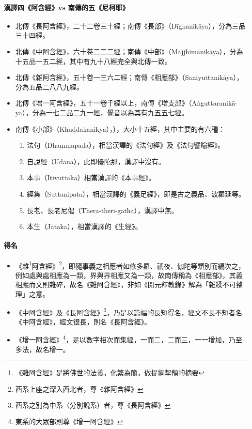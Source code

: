 \paragraph{漢譯四《阿含經》vs 南傳的五《尼柯耶》}
\begin{itemize}
  \item 北傳《長阿含經》，二十二卷三十經；南傳《長部》（Dīghanikāya），分為三品三十四經。
  \item 北傳《中阿含經》，六十卷二二二經；南傳《中部》（Majjhimanikāya），分為十五品一五二經，其中有九十八經完全與北傳一致。
  \item 北傳《雜阿含經》，五十卷一三六二經；南傳《相應部》（Saṁyuttanikāya），分為五品二八八九經。
  \item 北傳《增一阿含經》，五十一卷千經以上，南傳《增支部》（Aṅguttaranikā-ya），分為一七二品二九一經，覺音以為其有九五五七經。
  \item 南傳《小部》（Khuddakanikya），），大小十五經，其中主要的有六種：
    \begin{enumerate}
      \item 法句（Dhammapada），相當漢譯的《法句經》及《法句譬喻經》。
      \item 自說經（Udāna），此即優陀那，漢譯中沒有。
      \item 本事（Itivuttaka）相當漢譯的《本事經》。
      \item 經集（Suttanipata），相當漢譯的《義足經》，即是古之義品、波羅延等。
      \item 長老、長老尼偈（Thera-theri-gatha），漢譯中無。
      \item 本生（Jātaka），相當漢譯的《生經》。
    \end{enumerate}
\end{itemize}
\paragraph{得名}
\begin{itemize}
  \item 《雜\footnote{《雜阿含經》是將佛世的法義，化繁為簡，做提綱挈領的摘要}阿含經》\footnote{西系上座之深入西北者，尊《雜阿含經》}，即隨事義之相應者如修多羅、祇夜、伽陀等類別而編次之，例如處與處相應為一類，界與界相應又為一類，故南傳稱為《相應部》，其義相應而文則雜碎，故名《雜阿含經》，非如《開元釋教錄》解為「雜糅不可整理」之意。
  \item 《中阿含經》及《長阿含經》\footnote{西系之別為中系（分別說系）者，尊《長阿含經》}，乃是以篇幅的長短得名，經文不長不短者名《中阿含經》，經文很長，則名《長阿含經》。
  \item 《增一阿含經》\footnote{東系的大眾部則尊《增一阿含經》}，是以數字相次而集經，一而二，二而三，一一增加，乃至多法，故名增一。
\end{itemize}
